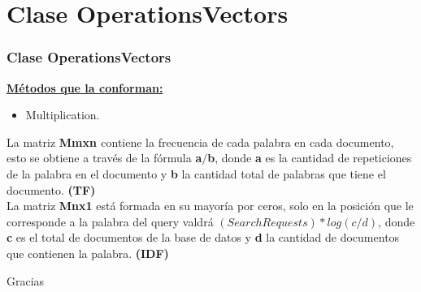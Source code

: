 \documentclass{beamer}
\begin{document}
\section{Clase OperationsVectors}
\begin{frame}
  \frametitle{Clase OperationsVectors}

  \vspace{-2cm}
  \textbf{\underline{Métodos que la conforman: }} 

\begin{itemize}
    \item Multiplication. 
  \end{itemize}
  
  La matriz \textbf {M{\tiny mxn }} contiene la frecuencia de cada palabra en cada documento, esto se obtiene a través de la fórmula \textbf{a$/$b}, donde \textbf{a} es la cantidad de repeticiones de la palabra en el documento y \textbf{b} la cantidad total de palabras que tiene el documento. \textbf{(TF)} \\
  \vspace{0.2cm}
  La matriz \textbf {M{\tiny nx1}} está formada en su mayoría por ceros, solo en la posición que le corresponde a la palabra del query valdrá \textbf{\((SearchRequests) * log(c/d)\)}, donde \textbf{c} es el total de documentos de la base de datos y \textbf{d} la cantidad de documentos que contienen la palabra. \textbf{(IDF)}
\end{frame}


\begin{frame}{Gracias}
\end{frame}
\end{document}
